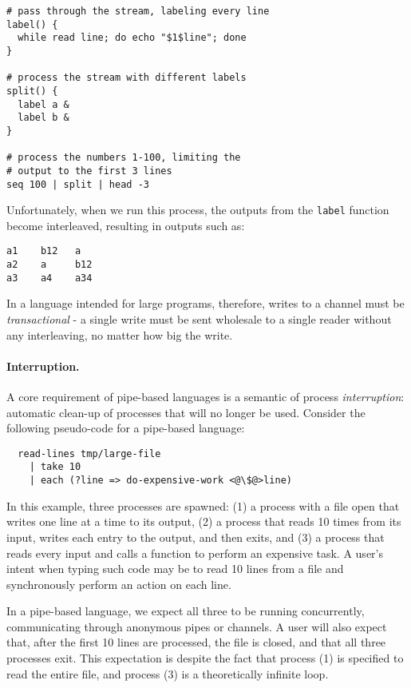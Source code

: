 \documentclass[format=sigconf, review=true, draft=true, screen=true]{acmart}
\begin{document}
\begin{lstlisting}
# pass through the stream, labeling every line
label() {
  while read line; do echo "$1$line"; done
}

# process the stream with different labels
split() {
  label a &
  label b &
}

# process the numbers 1-100, limiting the
# output to the first 3 lines
seq 100 | split | head -3
\end{lstlisting}

Unfortunately, when we run this process, the outputs from the \verb/label/ function become interleaved, resulting in outputs such as:

\begin{verbatim}
a1    b12   a
a2    a     b12
a3    a4    a34
\end{verbatim}
In a language intended for large programs, therefore, writes to a channel must be \emph{transactional} - a single write must be sent wholesale to a single reader without any interleaving, no matter how big the write.


\paragraph{Interruption.}
A core requirement of pipe-based languages is a semantic of process \emph{interruption}: automatic clean-up of processes that will no longer be used. Consider the following pseudo-code for a pipe-based language:

\begin{lstlisting}
  read-lines tmp/large-file
    | take 10
    | each (?line => do-expensive-work <@\$@>line)
\end{lstlisting}

In this example, three processes are spawned: (1) a process with a file open that writes one line at a time to its output, (2) a process that reads 10 times from its input, writes each entry to the output, and then exits, and (3) a process that reads every input and calls a function to perform an expensive task.
A user's intent when typing such code may be to read 10 lines from a file and synchronously perform an action on each line.

In a pipe-based language, we expect all three to be running concurrently, communicating through anonymous pipes or channels.
A user will also expect that, after the first 10 lines are processed, the file is closed, and that all three processes exit.
This expectation is despite the fact that process (1) is specified to read the entire file, and process (3) is a theoretically infinite loop.
\end{document}
